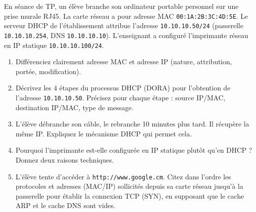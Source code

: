 \documentclass[11pt]{article}
\begin{document}
\begin{exercice}
En séance de TP, un élève branche son ordinateur portable personnel sur une prise murale RJ45. La carte réseau a pour adresse MAC \texttt{00:1A:2B:3C:4D:5E}. Le serveur DHCP de l'établissement attribue l'adresse \texttt{10.10.10.50/24} (passerelle \texttt{10.10.10.254}, DNS \texttt{10.10.10.10}). L'enseignant a configuré l'imprimante réseau en IP statique \texttt{10.10.10.100/24}.

\begin{enumerate}
    \item Différenciez clairement adresse MAC et adresse IP (nature, attribution, portée, modification).
    \item Décrivez les 4 étapes du processus DHCP (DORA) pour l'obtention de l'adresse \texttt{10.10.10.50}. Précisez pour chaque étape : source IP/MAC, destination IP/MAC, type de message.
    \item L'élève débranche son câble, le rebranche 10 minutes plus tard. Il récupère la même IP. Expliquez le mécanisme DHCP qui permet cela.
    \item Pourquoi l'imprimante est-elle configurée en IP statique plutôt qu'en DHCP ? Donnez deux raisons techniques.
    \item L'élève tente d'accéder à \texttt{http://www.google.cm}. Citez dans l'ordre les protocoles et adresses (MAC/IP) sollicités depuis sa carte réseau jusqu'à la passerelle pour établir la connexion TCP (SYN), en supposant que le cache ARP et le cache DNS sont vides.
\end{enumerate}
\end{exercice}
\end{document}
